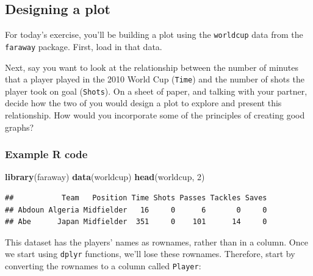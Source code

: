 \documentclass[]{book}
\makeatletter
\newenvironment{Shaded}{\begin{snugshade}}{\end{snugshade}}
\newcommand{\KeywordTok}[1]{\textcolor[rgb]{0.13,0.29,0.53}{\textbf{#1}}}
\newcommand{\DataTypeTok}[1]{\textcolor[rgb]{0.13,0.29,0.53}{#1}}
\newcommand{\DecValTok}[1]{\textcolor[rgb]{0.00,0.00,0.81}{#1}}
\newcommand{\StringTok}[1]{\textcolor[rgb]{0.31,0.60,0.02}{#1}}
\newcommand{\OperatorTok}[1]{\textcolor[rgb]{0.81,0.36,0.00}{\textbf{#1}}}
\newcommand{\NormalTok}[1]{#1}
\newenvironment{kframe}{%
\medskip{}
\setlength{\fboxsep}{.8em}
 \def\at@end@of@kframe{}%
 \ifinner\ifhmode%
  \def\at@end@of@kframe{\end{minipage}}%
  \begin{minipage}{\columnwidth}%
 \fi\fi%
 \def\FrameCommand##1{\hskip\@totalleftmargin \hskip-\fboxsep
 \colorbox{shadecolor}{##1}\hskip-\fboxsep
     \hskip-\linewidth \hskip-\@totalleftmargin \hskip\columnwidth}%
 \MakeFramed {\advance\hsize-\width
   \@totalleftmargin\z@ \linewidth\hsize
   \@setminipage}}%
 {\par\unskip\endMakeFramed%
 \at@end@of@kframe}
\renewenvironment{Shaded}{\begin{kframe}}{\end{kframe}}
\theoremstyle{definition}
\theoremstyle{definition}
\theoremstyle{definition}
\theoremstyle{remark}
\makeatother
\begin{document}
\subsection{Designing a plot}\label{designing-a-plot}

For today's exercise, you'll be building a plot using the
\texttt{worldcup} data from the \texttt{faraway} package. First, load in
that data.

Next, say you want to look at the relationship between the number of
minutes that a player played in the 2010 World Cup (\texttt{Time}) and
the number of shots the player took on goal (\texttt{Shots}). On a sheet
of paper, and talking with your partner, decide how the two of you would
design a plot to explore and present this relationship. How would you
incorporate some of the principles of creating good graphs?

\subsubsection{Example R code}\label{example-r-code-4}

\begin{Shaded}
\begin{Highlighting}[]
\KeywordTok{library}\NormalTok{(faraway)}
\KeywordTok{data}\NormalTok{(worldcup)}
\KeywordTok{head}\NormalTok{(worldcup, }\DecValTok{2}\NormalTok{)}
\end{Highlighting}
\end{Shaded}

\begin{verbatim}
##           Team   Position Time Shots Passes Tackles Saves
## Abdoun Algeria Midfielder   16     0      6       0     0
## Abe      Japan Midfielder  351     0    101      14     0
\end{verbatim}

This dataset has the players' names as rownames, rather than in a
column. Once we start using \texttt{dplyr} functions, we'll lose these
rownames. Therefore, start by converting the rownames to a column called
\texttt{Player}:

\begin{Shaded}
\end{Shaded}
\end{document}
